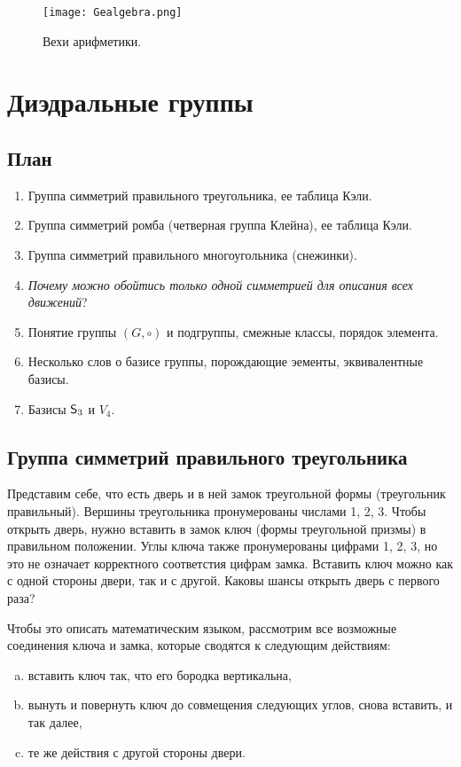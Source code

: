 
\begin{figure}[htb!]
\begin{center}
\texttt{[image: Gealgebra.png]}
\end{center}
\caption{Вехи арифметики.}\label{ariphmetics}
\end{figure}

\section{Диэдральные группы}


\subsection{План}
\begin{enumerate}
\item Группа симметрий правильного треугольника, ее таблица Кэли.
\item Группа симметрий ромба (четверная группа Клейна), ее таблица Кэли.
\item Группа симметрий правильного многоугольника (снежинки).
\item \textit{Почему можно обойтись только одной симметрией для описания всех движений}?
\item Понятие группы $(G,\circ)$ и подгруппы, смежные классы, порядок элемента.
\item Несколько слов о базисе группы, порождающие эементы, эквивалентные базисы.
\item Базисы ${\mathsf{S}}_3$ и $V_4$.
\end{enumerate}

\subsection{Группа симметрий правильного треугольника}

Представим себе, что есть дверь и в ней замок треугольной формы (треугольник правильный). Вершины треугольника пронумерованы числами 1, 2, 3. Чтобы открыть дверь, нужно вставить в замок ключ (формы треугольной призмы) в правильном положении.
Углы ключа также пронумерованы цифрами 1, 2, 3, но это не означает корректного соответстия цифрам замка.
Вставить ключ можно как с одной стороны двери, так и с другой. Каковы шансы открыть дверь с первого раза?

Чтобы это описать математическим языком, рассмотрим все возможные соединения ключа и замка, которые сводятся к следующим действиям:
\begin{enumerate}[a)]
\item вставить ключ так, что его бородка вертикальна,
\item вынуть и повернуть ключ до совмещения следующих углов, снова вставить, и так далее,
\item те же действия с другой стороны двери.
\end{enumerate}

